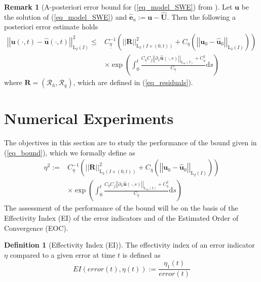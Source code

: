 \documentclass[12pt,a4paper]{article}
\numberwithin{equation}{section}
\theoremstyle{definition}
\newcommand{\Norm}[1]{\left|\left|#1\right|\right|}
\newcommand{\vect}[1]{\textbf{#1}}
\newcommand{\leb}{\text{L}}
\newcommand{\Coeta}{C_{\overline{\eta}}}
\newcommand{\Cof}{C_{\overline{f}}}
\newcommand{\Cueta}{C_{\underline{\eta}}}
\newcommand{\qp}[1]{\left(#1\right)}
\newcommand{\rec}[1]{\widehat{{#1}}}
\newtheorem{Defn}[subsection]{Definition}
\newtheorem{Rem}[subsection]{Remark}
\begin{document}
\begin{Rem}[A-posteriori error bound for (\ref{eq_model_SWE}) from \cite{giesselmann2015posteriori}]\label{thm:bound}
Let $\vect{u}$ be the solution of (\ref{eq_model_SWE}) and $ \widehat{\vect{e}}_u:=\vect{u}-\rec{\vect{U}}$. Then the following a posteriori error estimate holds
\begin{equation}\label{eq_bound}
\begin{aligned}
\Norm{\vect{u}\qp{\cdot,t}- \widehat{\vect{u}}\qp{\cdot,t}}_{\leb_2\qp{I}}^2\leq& C_{\underline{\eta}}^{-1}\qp{\Norm{\vect{R}}^2_{\leb_2\qp{I\times\qp{0,t}}} +C_{\overline{\eta}}\qp{\Norm{\vect{u}_0-\rec{\vect{u}}_0}_{\leb_2\qp{I}}}}\\
&\times\exp\qp{\int^t_0\frac{\Cueta\Cof\Norm{\partial_x\rec{\vect{u}}\qp{\cdot,s}}_{\leb_\infty\qp{I}}+\Coeta^2}{\Cueta}\mathrm{d}s}
\end{aligned}
\end{equation}
where $\vect{R}=\qp{\mathcal{R}_h,\mathcal{R}_q}$, which are defined in (\ref{eq_residuals}).
\end{Rem}

\section{Numerical Experiments}\label{sec_num_exp}
The objectives in this section are to study the performance of the bound given in (\ref{eq_bound}), which we formally define as 
\begin{equation}\label{eq_estimator}
\begin{aligned}
\eta^2:=& C_{\underline{\eta}}^{-1}\qp{\Norm{\vect{R}}^2_{\leb_2\qp{I\times\qp{0,t}}} +C_{\overline{\eta}}\qp{\Norm{\vect{u}_0-\rec{\vect{u}}_0}_{\leb_2\qp{I}}}}\\
&\times\exp\qp{\int^t_0\frac{\Cueta\Cof\Norm{\partial_x\rec{\vect{u}}\qp{\cdot,s}}_{\leb_\infty\qp{I}}+\Coeta^2}{\Cueta}\mathrm{d}s}
\end{aligned}
\end{equation}
The assessment of the performance of the bound will be on the basis of the Effectivity Index (EI) of the error indicators and of the Estimated Order of Convergence (EOC).
\begin{Defn}[Effectivity Index (EI)] The effectivity index of an error indicator $\eta$ compared to a given error at time $t$ is defined as
\begin{equation}\label{eq_EI}
EI\qp{error\qp{t}, \eta\qp{t}} := \frac{\eta_1\qp{t}}{error\qp{t}}
\end{equation}
\end{Defn}
\end{document}
